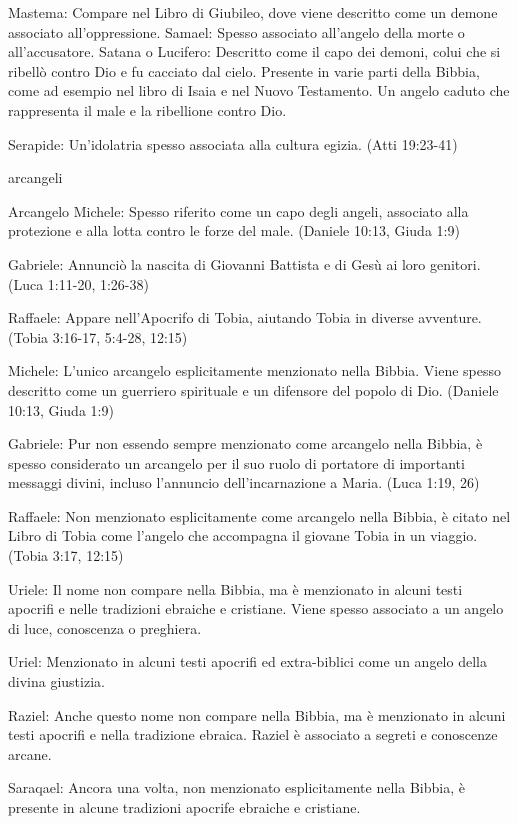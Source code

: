 \documentclass[12pt,a4paper,twoside,openany]{book}
\begin{document}
Mastema: Compare nel Libro di Giubileo, dove viene descritto come un demone associato all'oppressione.
Samael: Spesso associato all'angelo della morte o all'accusatore.
Satana o Lucifero: Descritto come il capo dei demoni, colui che si ribellò contro Dio e fu cacciato dal cielo. Presente in varie parti della Bibbia, come ad esempio nel libro di Isaia e nel Nuovo Testamento. Un angelo caduto che rappresenta il male e la ribellione contro Dio.

Serapide: Un'idolatria spesso associata alla cultura egizia. (Atti 19:23-41)


arcangeli


Arcangelo Michele: Spesso riferito come un capo degli angeli, associato alla protezione e alla lotta contro le forze del male. (Daniele 10:13, Giuda 1:9)

Gabriele: Annunciò la nascita di Giovanni Battista e di Gesù ai loro genitori. (Luca 1:11-20, 1:26-38)

Raffaele: Appare nell'Apocrifo di Tobia, aiutando Tobia in diverse avventure. (Tobia 3:16-17, 5:4-28, 12:15)


Michele: L'unico arcangelo esplicitamente menzionato nella Bibbia. Viene spesso descritto come un guerriero spirituale e un difensore del popolo di Dio. (Daniele 10:13, Giuda 1:9)

Gabriele: Pur non essendo sempre menzionato come arcangelo nella Bibbia, è spesso considerato un arcangelo per il suo ruolo di portatore di importanti messaggi divini, incluso l'annuncio dell'incarnazione a Maria. (Luca 1:19, 26)

Raffaele: Non menzionato esplicitamente come arcangelo nella Bibbia, è citato nel Libro di Tobia come l'angelo che accompagna il giovane Tobia in un viaggio. (Tobia 3:17, 12:15)

Uriele: Il nome non compare nella Bibbia, ma è menzionato in alcuni testi apocrifi e nelle tradizioni ebraiche e cristiane. Viene spesso associato a un angelo di luce, conoscenza o preghiera.

Uriel: Menzionato in alcuni testi apocrifi ed extra-biblici come un angelo della divina giustizia.

Raziel: Anche questo nome non compare nella Bibbia, ma è menzionato in alcuni testi apocrifi e nella tradizione ebraica. Raziel è associato a segreti e conoscenze arcane.


Saraqael: Ancora una volta, non menzionato esplicitamente nella Bibbia, è presente in alcune tradizioni apocrife ebraiche e cristiane.
\end{document}
